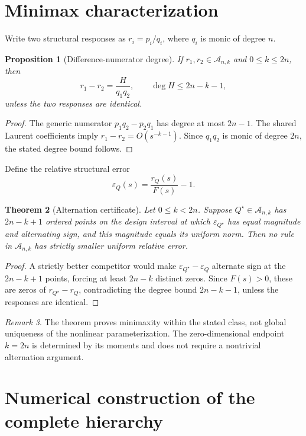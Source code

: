 \documentclass[preprint,12pt]{elsarticle}
\newtheorem{theorem}{Theorem}
\newtheorem{proposition}[theorem]{Proposition}
\theoremstyle{remark}
\newtheorem{remark}[theorem]{Remark}
\begin{document}
\section{Minimax characterization}

Write two structural responses as \(r_i=p_i/q_i\), where \(q_i\) is
monic of degree \(n\).

\begin{proposition}[Difference-numerator degree]
If \(r_1,r_2\in\mathcal A_{n,k}\) and \(0\leq k\leq2n\), then
\[
r_1-r_2=\frac{H}{q_1q_2},
\qquad
\deg H\leq2n-k-1,
\]
unless the two responses are identical.
\end{proposition}

\begin{proof}
The generic numerator \(p_1q_2-p_2q_1\) has degree at most \(2n-1\).
The shared Laurent coefficients imply
\(r_1-r_2=O(s^{-k-1})\). Since \(q_1q_2\) is monic of degree \(2n\),
the stated degree bound follows.
\end{proof}

Define the relative structural error
\[
\varepsilon_Q(s)=\frac{r_Q(s)}{F(s)}-1.
\]

\begin{theorem}[Alternation certificate]
Let \(0\leq k<2n\). Suppose \(Q^\star\in\mathcal A_{n,k}\) has
\(2n-k+1\) ordered points on the design interval at which
\(\varepsilon_{Q^\star}\) has equal magnitude and alternating sign, and
this magnitude equals its uniform norm. Then no rule in
\(\mathcal A_{n,k}\) has strictly smaller uniform relative error.
\end{theorem}

\begin{proof}
A strictly better competitor would make
\(\varepsilon_{Q^\star}-\varepsilon_Q\) alternate sign at the
\(2n-k+1\) points, forcing at least \(2n-k\) distinct zeros. Since
\(F(s)>0\), these are zeros of \(r_{Q^\star}-r_Q\), contradicting the
degree bound \(2n-k-1\), unless the responses are identical.
\end{proof}

\begin{remark}
The theorem proves minimaxity within the stated class, not global
uniqueness of the nonlinear parameterization. The zero-dimensional
endpoint \(k=2n\) is determined by its moments and does not require a
nontrivial alternation argument.
\end{remark}

\section{Numerical construction of the complete hierarchy}
\end{document}
